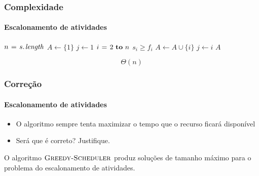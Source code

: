 \documentclass{beamer}
\begin{document}

\begin{frame}
\frametitle{Complexidade}
\framesubtitle{Escalonamento de atividades}

\begin{codebox}
\li $n \gets \attrib{s}{length}$
\li $A \gets \{ 1 \}$
\li $j \gets 1$
\li \For $i \gets 2 \To n$ 
\li \Do \If $s_i \ge f_i$ 
\li   \Then $A \gets A \cup \{ i \}$
\li     $j \gets i$
      \End
    \End
\li \Return $A$
\end{codebox}
\pause
\alert{$$\Theta(n)$$}
\end{frame}


\begin{frame}
\frametitle{Correção}
\framesubtitle{Escalonamento de atividades}

\begin{itemize}
\item O algoritmo sempre tenta maximizar o tempo que o recurso ficará disponível
\item Será que é correto? Justifique.
\end{itemize}

\begin{theorem}
O algoritmo $\textnormal{\scshape Greedy-Scheduler}$ produz soluções de tamanho máximo para o
problema do escalonamento de atividades.
\end{theorem}

\end{frame}

\end{document}
